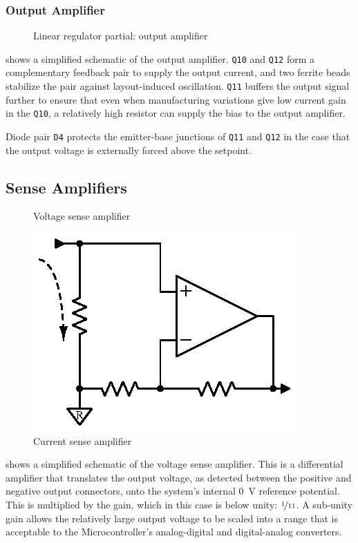 \documentclass[letterpaper,twocolumn,10pt,openany,oneside,final,fleqn]{memoir}
\newcommand{\rd}[1]{\texttt{#1}}
\newcommand{\xcircuit}[1]{ \centering \textsf{  } }
\begin{document}
\subsubsection{Output Amplifier}

\begin{figure}
\xcircuit{outamp}
\caption{Linear regulator partial: output amplifier}
\label{fig:outputamp}
\end{figure}

 shows a simplified schematic of the output amplifier. \rd{Q10}
and \rd{Q12} form a complementary feedback pair to supply the output current, and
two ferrite beads stabilize the pair against layout-induced oscillation. \rd{Q11}
buffers the output signal further to ensure that even when manufacturing variations
give low current gain in the \rd{Q10}, a relatively high resistor can supply the
bias to the output amplifier.

Diode pair \rd{D4} protects the emitter-base junctions of \rd{Q11} and \rd{Q12} in
the case that the output voltage is externally forced above the setpoint.

\subsection{Sense Amplifiers}

\begin{figure}
\xcircuit{vsense}
\caption{Voltage sense amplifier}
\label{fig:vsense}
\end{figure}

\begin{figure}
\centering
\includegraphics{isense}
\caption{Current sense amplifier}
\label{fig:isense}
\end{figure}

 shows a simplified schematic of the voltage sense amplifier. This
is a differential amplifier that translates the output voltage, as detected between
the positive and negative output connectors, onto the system's internal \SI{0}{V}
reference potential. This is multiplied by the gain, which in this case is below
unity: $\nicefrac{1}{11}$. A sub-unity gain allows the relatively large output voltage
to be scaled into a range that is acceptable to the Microcontroller's analog-digital
and digital-analog converters.
\end{document}
